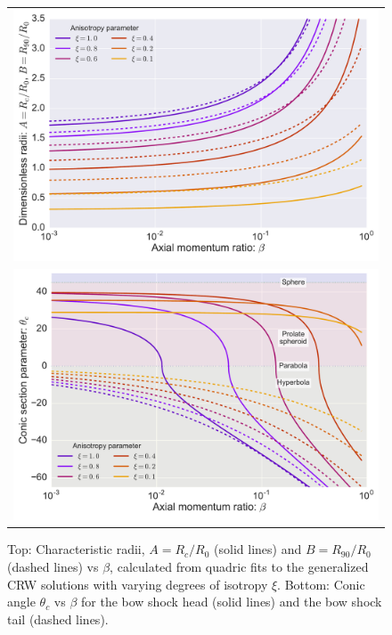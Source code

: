\begin{figure}
\begin{tabular}{c}
\includegraphics[width=\linewidth]{figs/AB-beta-log} \\
\includegraphics[width=\linewidth]{figs/thc-beta-log}
\end{tabular}
\caption{Top: Characteristic radii, $A = R_c/R_0$ (solid lines) and $B
  = R_{90}/R_0$ (dashed lines)
  vs $\beta$, calculated from quadric fits to the generalized CRW
  solutions with varying degrees of isotropy $\xi$.  Bottom: Conic
  angle $\theta_c$ vs $\beta$ for the bow 
  shock head (solid lines) and the bow shock tail (dashed lines).}
\label{fig:rad-beta}
\end{figure}



